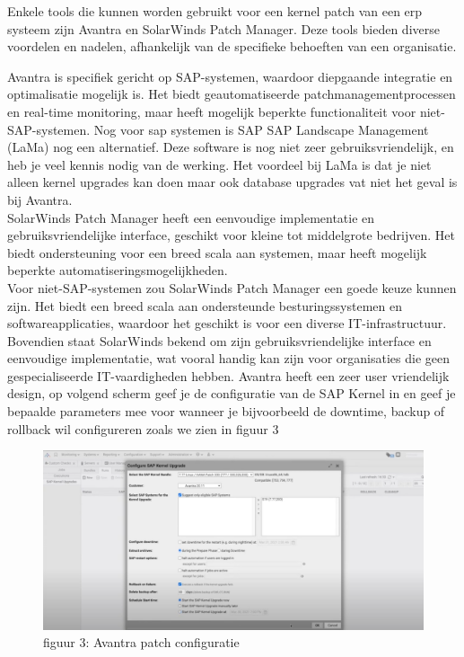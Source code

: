 \documentclass[dutch,dit,thesis]{hogentreport}
\begin{document}
 Enkele tools die kunnen worden gebruikt voor een kernel patch van een erp systeem zijn Avantra en SolarWinds Patch Manager. Deze tools bieden diverse voordelen en nadelen, afhankelijk van de specifieke behoeften van een organisatie.

 Avantra is specifiek gericht op SAP-systemen, waardoor diepgaande integratie en optimalisatie mogelijk is. Het biedt geautomatiseerde patchmanagementprocessen en real-time monitoring, maar heeft 
 mogelijk beperkte functionaliteit voor niet-SAP-systemen. Nog voor sap systemen is SAP SAP Landscape Management (LaMa) nog een alternatief. Deze software is nog niet zeer gebruiksvriendelijk, en heb je veel kennis nodig van de werking. Het voordeel 
 bij LaMa is dat je niet alleen kernel upgrades kan doen maar ook database upgrades vat niet het geval is bij Avantra. \\
 SolarWinds Patch Manager heeft een eenvoudige implementatie en gebruiksvriendelijke interface, geschikt voor kleine tot middelgrote bedrijven. Het biedt ondersteuning voor een breed scala aan 
 systemen, maar heeft mogelijk beperkte automatiseringsmogelijkheden. \\


 Voor niet-SAP-systemen zou SolarWinds Patch Manager een goede keuze kunnen zijn. Het biedt een breed scala aan ondersteunde besturingssystemen en softwareapplicaties, waardoor het geschikt is voor
  een diverse IT-infrastructuur. Bovendien staat SolarWinds bekend om zijn gebruiksvriendelijke interface en eenvoudige implementatie, wat vooral handig kan zijn voor organisaties die geen gespecialiseerde IT-vaardigheden hebben.
 Avantra heeft een zeer user vriendelijk design, op volgend scherm geef je de configuratie van de SAP Kernel in en geef je bepaalde parameters mee voor wanneer je bijvoorbeeld de downtime, backup of 
 rollback wil configureren zoals we zien in figuur 3
 

\begin{figure}[htbp]
    \centering
    \includegraphics[width=\textwidth]{avantra1.png}
    \caption{figuur 3: Avantra patch configuratie}
     \label{fig:avantra1}
\end{figure}
\end{document}
